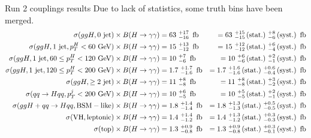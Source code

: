 \begin{frame}{Run 2 couplings results}
  \centering
  Due to lack of statistics, some truth bins have been merged.
  \tiny 
  \begin{align*}
    \sigma (ggH, \mathrm{0~jet}) \tbfhyy &= 63\ ^{+17}_{-16}\ \fb  &= 63\ ^{+15}_{-15}\,\mathrm{(stat.)}\ ^{+8}_{-6}\,\mathrm{(syst.)}\ \fb \\
    \sigma (ggH, \mathrm{1~jet}, p_T^{H} < 60\ \text{GeV}) \tbfhyy &= 15\ ^{+13}_{-12}\ \fb  &= 15\ ^{+12}_{-12}\,\mathrm{(stat.)}\ ^{+6}_{-4}\,\mathrm{(syst.)}\ \fb \\
    \sigma (ggH, \mathrm{1~jet}, 60 \leq p_T^{H} < 120\ \text{GeV}) \tbfhyy &= 10\ ^{+7}_{-6}\ \fb  &= 10\ ^{+6}_{-6}\,\mathrm{(stat.)}\ ^{+2}_{-1}\,\mathrm{(syst.)}\ \fb \\
    \sigma (ggH, \mathrm{1~jet}, 120 \leq p_T^{H} < 200\ \text{GeV}) \tbfhyy &= 1.7\ ^{+1.7}_{-1.6}\ \fb  & = 1.7\ ^{+1.6}_{-1.6}\,\mathrm{(stat.)}\ ^{+0.6}_{-0.4}\,\mathrm{(syst.)}\ \fb \\
    \sigma (ggH, \geq 2~\mathrm{jet}) \tbfhyy &= 11\ ^{+8}_{-8}\ \fb  &= 11\ ^{+8}_{-8}\,\mathrm{(stat.)}\ ^{+3}_{-2}\,\mathrm{(syst.)}\ \fb \\
    \sigma (qq \rightarrow Hqq, p_T^{j} < 200~\text{GeV}) \tbfhyy &= 10\ ^{+6}_{-5}\ \fb  &= 10\ ^{+5}_{-5}\,\mathrm{(stat.)}\ ^{+2}_{-1}\,\mathrm{(syst.)}\ \fb \\
    \sigma (ggH + qq \rightarrow Hqq, \mathrm{BSM-like}) \tbfhyy &= 1.8\ ^{+1.4}_{-1.4}\ \fb  &= 1.8\ ^{+1.3}_{-1.3}\,\mathrm{(stat.)}\ ^{+0.5}_{-0.5}\,\mathrm{(syst.)}\ \fb \\
    \sigma (\mathrm{VH, leptonic}) \tbfhyy &= 1.4\ ^{+1.4}_{-1.2}\ \fb  &= 1.4\ ^{+1.3}_{-1.2}\,\mathrm{(stat.)}\ ^{+0.3}_{-0.3}\,\mathrm{(syst.)}\ \fb \\
    \sigma (\mathrm{top}) \tbfhyy &= 1.3\ ^{+0.9}_{-0.8}\ \fb  &= 1.3\ ^{+0.9}_{-0.8}\,\mathrm{(stat.)}\ ^{+0.3}_{-0.1}\,\mathrm{(syst.)}\ \fb \\
\end{align*}

\end{frame}
